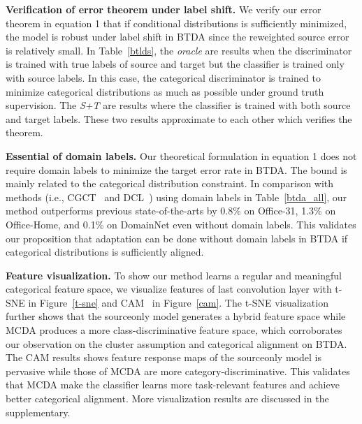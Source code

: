 \documentclass[letterpaper]{article} \usepackage{aaai23}  \usepackage{times}  \usepackage{helvet}  \usepackage{courier}  \usepackage[hyphens]{url}  \usepackage{graphicx} \urlstyle{rm} \def\UrlFont{\rm}  \usepackage{natbib}  \usepackage{caption} \frenchspacing  \setlength{\pdfpagewidth}{8.5in}  \setlength{\pdfpageheight}{11in}
\begin{document}
\noindent\textbf{Verification of error theorem under label shift.} We verify our error theorem in equation 1 that if conditional distributions  is sufficiently minimized, the model is robust under label shift in BTDA since the reweighted source error  is relatively small. In Table~\ref{btlds}, the \textit{oracle} are results when the discriminator is trained with true labels of source and target but the classifier is trained only with source labels. In this case, the categorical discriminator is trained to minimize categorical distributions as much as possible under ground truth supervision. The \textit{S+T} are results where the classifier is trained with both source and target labels. These two results approximate to each other which verifies the theorem.



\begin{table}[!htbp]
\centering
{}
\caption{Accuracy () of different uncertainty thresholds for \textit{Art} in Office-Home and \textit{Clipart} in Office-Home-LMT for BTDA (ResNet-50).}

\label{thre}
\end{table}





\noindent\textbf{Essential of domain labels.} Our theoretical formulation in equation 1 does not require domain labels to minimize the target error rate in BTDA. The bound is mainly related to the categorical distribution constraint. 
In comparison with methods (i.e., CGCT~\cite{roy2021curriculum} and DCL~\cite{nguyen2021unsupervised}) using domain labels  in Table~\ref{btda_all}, our method outperforms previous state-of-the-arts by 0.8\% on Office-31, 1.3\% on Office-Home, and 0.1\% on DomainNet even without domain labels.
This validates our proposition that adaptation can be done without domain labels in BTDA if categorical distributions is sufficiently aligned.

\noindent\textbf{Feature visualization.} To show our method learns a regular and meaningful categorical feature space, we visualize features of last convolution layer with t-SNE in Figure~\ref{t-sne} and CAM~\cite{selvaraju2017grad} in Figure~\ref{cam}. The t-SNE visualization further shows that the sourceonly model generates a hybrid feature space while MCDA produces a more class-discriminative feature space, which corroborates our observation on the cluster assumption and categorical alignment on BTDA. The CAM results shows feature response maps of the sourceonly model is pervasive while those of MCDA are more category-discriminative. This validates that MCDA make the classifier learns more task-relevant features and achieve better categorical alignment. More visualization results are discussed in the supplementary. 
\end{document}

